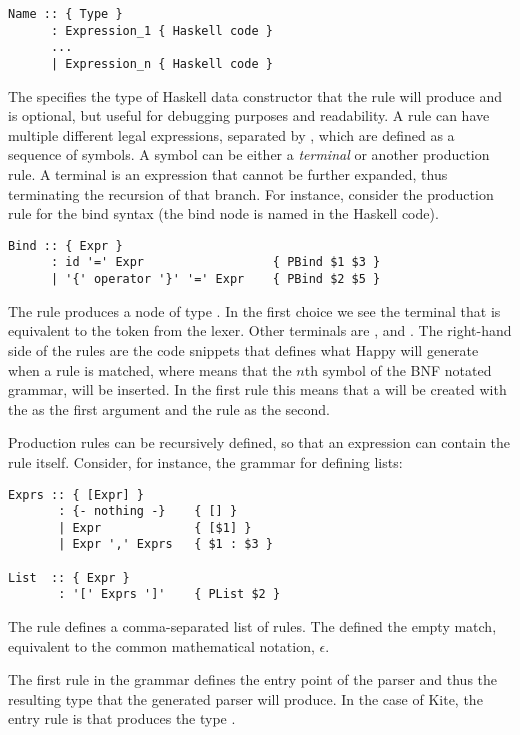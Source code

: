 \begin{lstlisting}
Name :: { Type }
      : Expression_1 { Haskell code }
      ...
      | Expression_n { Haskell code }
\end{lstlisting}

The  specifies the type of Haskell data constructor that the rule will produce and is optional, but useful for debugging purposes and readability. A rule can have multiple different legal expressions, separated by \code{|}, which are defined as a sequence of symbols. A symbol can be either a \emph{terminal} or another production rule. A terminal is an expression that cannot be further expanded, thus terminating the recursion of that branch. For instance, consider the production rule for the bind syntax (the bind node is named  in the Haskell code).

\begin{lstlisting}
Bind :: { Expr }
      : id '=' Expr                  { PBind $1 $3 }
      | '{' operator '}' '=' Expr    { PBind $2 $5 }
\end{lstlisting}

The  rule produces a node of type . In the first choice we see the  terminal that is equivalent to the  token from the lexer. Other terminals are ,  and . The right-hand side of the rules are the code snippets that defines what Happy will generate when a rule is matched, where  means that the $n$th symbol of the BNF notated grammar, will be inserted. In the first rule this means that a  will be created with the  as the first argument and the  rule as the second.

Production rules can be recursively defined, so that an expression can contain the rule itself. Consider, for instance, the grammar for defining lists:

\begin{lstlisting}
Exprs :: { [Expr] }
       : {- nothing -}    { [] }
       | Expr             { [$1] }
       | Expr ',' Exprs   { $1 : $3 }

List  :: { Expr }
       : '[' Exprs ']'    { PList $2 }
\end{lstlisting}

The  rule defines a comma-separated list of  rules. The  defined the empty match, equivalent to the common mathematical notation, $\epsilon$.

The first rule in the grammar defines the entry point of the parser and thus the resulting type that the generated parser will produce. In the case of Kite, the entry rule is  that produces the type \code{[Decl]}.

